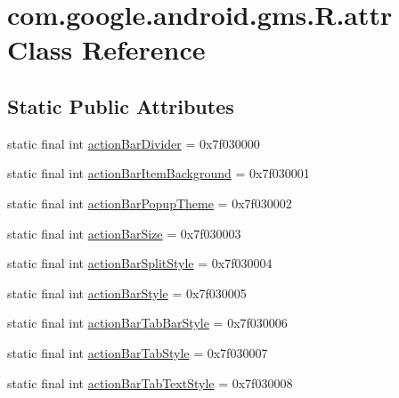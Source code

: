 \hypertarget{classcom_1_1google_1_1android_1_1gms_1_1R_1_1attr}{}\section{com.\+google.\+android.\+gms.\+R.\+attr Class Reference}
\label{classcom_1_1google_1_1android_1_1gms_1_1R_1_1attr}
\subsection*{Static Public Attributes}
\begin{DoxyCompactItemize}
\item 
static final int \mbox{\hyperlink{classcom_1_1google_1_1android_1_1gms_1_1R_1_1attr_a1430bf77f7f8d4cd6dabbf7e05515f68}{action\+Bar\+Divider}} = 0x7f030000
\item 
static final int \mbox{\hyperlink{classcom_1_1google_1_1android_1_1gms_1_1R_1_1attr_abef18e1cdab3f229401265da646a1042}{action\+Bar\+Item\+Background}} = 0x7f030001
\item 
static final int \mbox{\hyperlink{classcom_1_1google_1_1android_1_1gms_1_1R_1_1attr_ab95614a1f5df68bc5f839e833844025e}{action\+Bar\+Popup\+Theme}} = 0x7f030002
\item 
static final int \mbox{\hyperlink{classcom_1_1google_1_1android_1_1gms_1_1R_1_1attr_ae83a35534984e59fe57acde543de62fd}{action\+Bar\+Size}} = 0x7f030003
\item 
static final int \mbox{\hyperlink{classcom_1_1google_1_1android_1_1gms_1_1R_1_1attr_a15f1dff9a7caa204ba5a0be626dbd4c7}{action\+Bar\+Split\+Style}} = 0x7f030004
\item 
static final int \mbox{\hyperlink{classcom_1_1google_1_1android_1_1gms_1_1R_1_1attr_a124e11ee90daef0ea9e56b840a23de3a}{action\+Bar\+Style}} = 0x7f030005
\item 
static final int \mbox{\hyperlink{classcom_1_1google_1_1android_1_1gms_1_1R_1_1attr_af78f2c05712a63f27c133f87abfb2893}{action\+Bar\+Tab\+Bar\+Style}} = 0x7f030006
\item 
static final int \mbox{\hyperlink{classcom_1_1google_1_1android_1_1gms_1_1R_1_1attr_a7e88901a786eb3eb898f0815b4c99507}{action\+Bar\+Tab\+Style}} = 0x7f030007
\item 
static final int \mbox{\hyperlink{classcom_1_1google_1_1android_1_1gms_1_1R_1_1attr_a5a5566b77e721cdd668e57ee55140419}{action\+Bar\+Tab\+Text\+Style}} = 0x7f030008
\item 

\end{DoxyCompactItemize}
